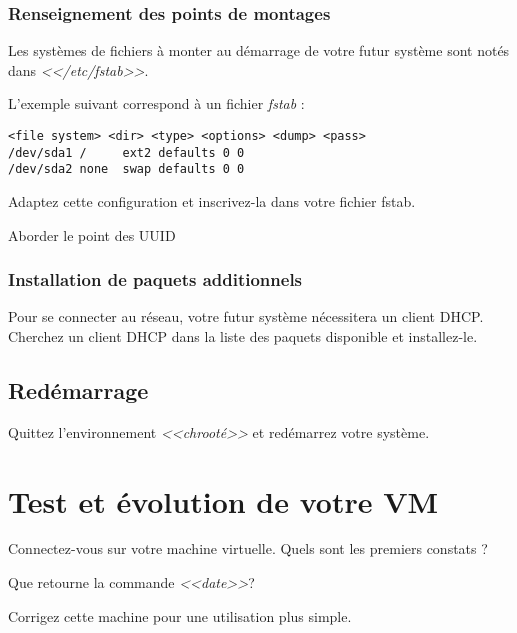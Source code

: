 \documentclass[11pt]{article}
\begin{document}
\subsubsection{Renseignement des points de montages}

Les systèmes de fichiers à monter au démarrage de votre futur système sont
notés dans \emph{<</etc/fstab>>}.

L'exemple suivant correspond à un fichier \emph{fstab} :

\begin{verbatim} 
<file system> <dir> <type> <options> <dump> <pass> 
/dev/sda1 /		ext2 defaults 0 0
/dev/sda2 none	swap defaults 0 0
\end{verbatim} 

Adaptez cette configuration et inscrivez-la dans votre fichier fstab.

\begin{solution}
Aborder le point des UUID
\end{solution}

\subsubsection{Installation de paquets additionnels}

Pour se connecter au réseau, votre futur système nécessitera un client DHCP.
Cherchez un client DHCP dans la liste des paquets disponible et installez-le.

\subsection{Redémarrage}

Quittez l'environnement \emph{<<chrooté>>} et redémarrez votre système.

\section{Test et évolution de votre VM}

Connectez-vous sur votre machine virtuelle. Quels sont les premiers constats ?

Que retourne la commande \emph{<<date>>}?

Corrigez cette machine pour une utilisation plus simple.
\end{document}
